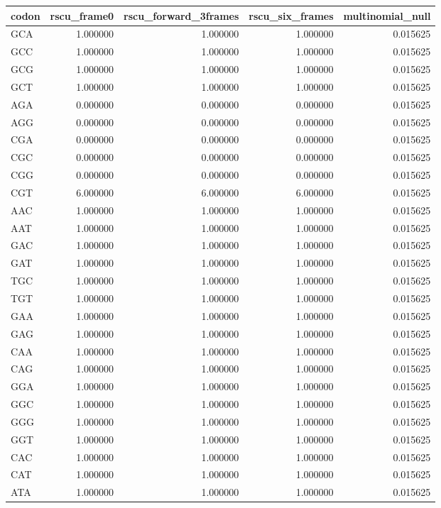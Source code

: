 \begin{tabular}{lrrrr}
\toprule
codon & rscu_frame0 & rscu_forward_3frames & rscu_six_frames & multinomial_null \\
\midrule
GCA & 1.000000 & 1.000000 & 1.000000 & 0.015625 \\
GCC & 1.000000 & 1.000000 & 1.000000 & 0.015625 \\
GCG & 1.000000 & 1.000000 & 1.000000 & 0.015625 \\
GCT & 1.000000 & 1.000000 & 1.000000 & 0.015625 \\
AGA & 0.000000 & 0.000000 & 0.000000 & 0.015625 \\
AGG & 0.000000 & 0.000000 & 0.000000 & 0.015625 \\
CGA & 0.000000 & 0.000000 & 0.000000 & 0.015625 \\
CGC & 0.000000 & 0.000000 & 0.000000 & 0.015625 \\
CGG & 0.000000 & 0.000000 & 0.000000 & 0.015625 \\
CGT & 6.000000 & 6.000000 & 6.000000 & 0.015625 \\
AAC & 1.000000 & 1.000000 & 1.000000 & 0.015625 \\
AAT & 1.000000 & 1.000000 & 1.000000 & 0.015625 \\
GAC & 1.000000 & 1.000000 & 1.000000 & 0.015625 \\
GAT & 1.000000 & 1.000000 & 1.000000 & 0.015625 \\
TGC & 1.000000 & 1.000000 & 1.000000 & 0.015625 \\
TGT & 1.000000 & 1.000000 & 1.000000 & 0.015625 \\
GAA & 1.000000 & 1.000000 & 1.000000 & 0.015625 \\
GAG & 1.000000 & 1.000000 & 1.000000 & 0.015625 \\
CAA & 1.000000 & 1.000000 & 1.000000 & 0.015625 \\
CAG & 1.000000 & 1.000000 & 1.000000 & 0.015625 \\
GGA & 1.000000 & 1.000000 & 1.000000 & 0.015625 \\
GGC & 1.000000 & 1.000000 & 1.000000 & 0.015625 \\
GGG & 1.000000 & 1.000000 & 1.000000 & 0.015625 \\
GGT & 1.000000 & 1.000000 & 1.000000 & 0.015625 \\
CAC & 1.000000 & 1.000000 & 1.000000 & 0.015625 \\
CAT & 1.000000 & 1.000000 & 1.000000 & 0.015625 \\
ATA & 1.000000 & 1.000000 & 1.000000 & 0.015625 \\

\end{tabular}
